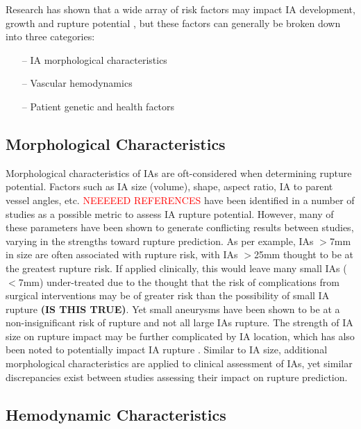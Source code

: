 Research has shown that a wide array of risk factors may impact IA development, growth and rupture potential \cite{Korja2014,penn2014role,starke2014tumor,diagbouga2018role}, but these factors can generally be broken down into three categories:
	\begin{itemize}
  		\item[--] IA morphological characteristics
 	    \item[--] Vascular hemodynamics
 	    \item[--] Patient genetic and health factors
	\end{itemize}

\subsection{Morphological Characteristics}

Morphological characteristics of IAs are oft-considered when determining rupture potential. Factors such as IA size (volume), shape, aspect ratio, IA to parent vessel angles, etc. \textcolor{red}{NEEEEED REFERENCES} have been identified in a number of studies as a possible metric to assess IA rupture potential. However, many of these parameters have been shown to generate conflicting results between studies, varying in the strengths toward rupture prediction. As per example, IAs $>$7mm in size are often associated with rupture risk, with IAs $>$25mm thought to be at the greatest rupture risk. If applied clinically, this would leave many small IAs ($<$7mm) under-treated due to the thought that the risk of complications from surgical interventions may be of greater risk than the possibility of small IA rupture \textbf{(IS THIS TRUE)}. Yet small aneurysms have been shown to be at a non-insignificant risk of rupture \cite{duan2018morphological} and not all large IAs rupture. The strength of IA size on rupture impact may be further complicated by IA location, which has also been noted to potentially impact IA rupture \cite{ucas2012natrual,weir2002sizes}. Similar to IA size, additional morphological characteristics are applied to clinical assessment of IAs, yet similar discrepancies exist between studies assessing their impact on rupture prediction.

\subsection{Hemodynamic Characteristics}

